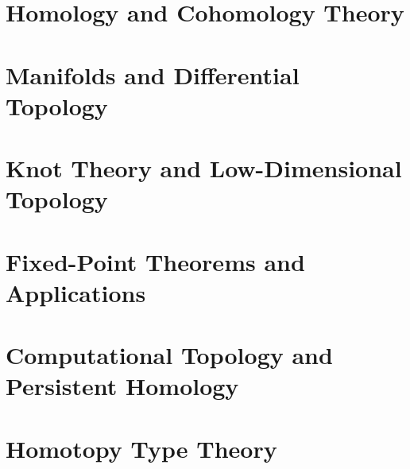 \chapter{Homology and Cohomology Theory}
\chapter{Manifolds and Differential Topology}
\chapter{Knot Theory and Low-Dimensional Topology}
\chapter{Fixed-Point Theorems and Applications}
\chapter{Computational Topology and Persistent Homology}
\chapter{Homotopy Type Theory}